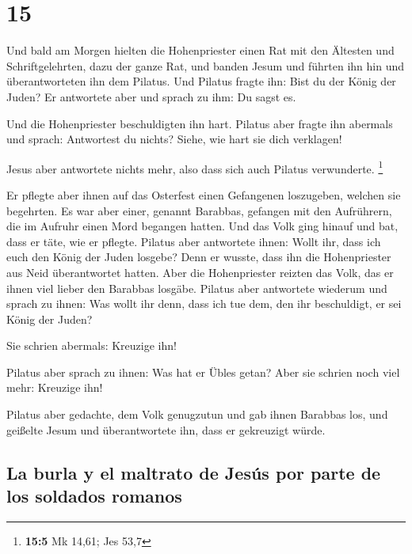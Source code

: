 \hypertarget{section-14}{%
\section{15}\label{section-14}}

 Und bald am Morgen hielten die Hohenpriester einen Rat
mit den Ältesten und Schriftgelehrten, dazu der ganze Rat, und banden
Jesum und führten ihn hin und überantworteten ihn dem Pilatus.
 Und Pilatus fragte ihn: Bist du der König der Juden? Er
antwortete aber und sprach zu ihm: Du sagst es.

 Und die Hohenpriester beschuldigten ihn hart.
 Pilatus aber fragte ihn abermals und sprach: Antwortest
du nichts? Siehe, wie hart sie dich verklagen!

 Jesus aber antwortete nichts mehr, also dass sich auch
Pilatus verwunderte. \footnote{\textbf{15:5} Mk 14,61; Jes 53,7}

 Er pflegte aber ihnen auf das Osterfest einen Gefangenen
loszugeben, welchen sie begehrten.  Es war aber einer,
genannt Barabbas, gefangen mit den Aufrührern, die im Aufruhr einen Mord
begangen hatten.  Und das Volk ging hinauf und bat, dass
er täte, wie er pflegte.  Pilatus aber antwortete ihnen:
Wollt ihr, dass ich euch den König der Juden losgebe? 
Denn er wusste, dass ihn die Hohenpriester aus Neid überantwortet
hatten.  Aber die Hohenpriester reizten das Volk, das er
ihnen viel lieber den Barabbas losgäbe.  Pilatus aber
antwortete wiederum und sprach zu ihnen: Was wollt ihr denn, dass ich
tue dem, den ihr beschuldigt, er sei König der Juden?

 Sie schrien abermals: Kreuzige ihn!

 Pilatus aber sprach zu ihnen: Was hat er Übles getan?
Aber sie schrien noch viel mehr: Kreuzige ihn!

 Pilatus aber gedachte, dem Volk genugzutun und gab ihnen
Barabbas los, und geißelte Jesum und überantwortete ihn, dass er
gekreuzigt würde.

\hypertarget{la-burla-y-el-maltrato-de-jesuxfas-por-parte-de-los-soldados-romanos}{%
\subsection{La burla y el maltrato de Jesús por parte de los soldados
romanos}\label{la-burla-y-el-maltrato-de-jesuxfas-por-parte-de-los-soldados-romanos}}

